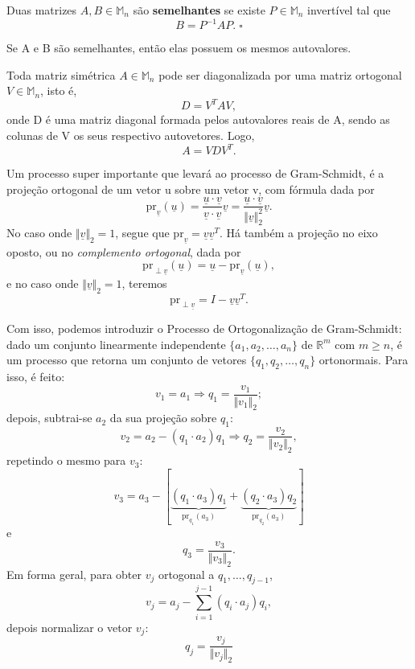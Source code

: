 \documentclass[../numerical_methods.tex]{subfiles}
\begin{document}
\begin{def*}
	Duas matrizes \(A, B\in \mathbb{M}_{n}\) são \textbf{semelhantes} se existe \(P\in \mathbb{M}_{n}\) invertível tal que
	\[
		B = P^{-1}A P. \; \square
	\]
\end{def*}
\begin{prop*}
	Se A e B são semelhantes, então elas possuem os mesmos autovalores.
\end{prop*}

Toda matriz simétrica \(A\in \mathbb{M}_{n}\) pode ser diagonalizada por uma matriz ortogonal \(V\in \mathbb{M}_{n}\), isto é,
\[
	D = V^{T}AV,
\]
onde D é uma matriz diagonal formada pelos autovalores reais de A, sendo as colunas de V os seus respectivo autovetores. Logo,
\[
	A = VDV^{T}.
\]

Um processo super importante que levará ao processo de Gram-Schmidt, é a projeção ortogonal de um vetor u sobre um vetor v, com fórmula dada por
\[
	\mathrm{pr}_{\underline{v}}(\underline{u}) = \frac{\underline{u}\cdot \underline{v}}{\underline{v}\cdot \underline{v}}\underline{v} = \frac{\underline{u}\cdot \underline{v}}{\Vert \underline{v} \Vert_{2}^{2}}\underline{v}.
\]
No caso onde \(\Vert \underline{v} \Vert_{2} = 1\), segue que \(\mathrm{pr}_{\underline{v}}= \underline{v}\underline{v}^{T}\). Há também a projeção no eixo oposto, ou no \textit{complemento ortogonal}, dada por
\[
	\mathrm{pr}_{\perp \underline{v}}(\underline{u}) = \underline{u} - \mathrm{pr}_{\underline{v}}(\underline{u}),
\]
e no caso onde \(\Vert \underline{v} \Vert_{2} = 1\), teremos
\[
	\mathrm{pr}_{\perp \underline{v}}=I - \underline{v}\underline{v}^{T}.
\]

Com isso, podemos introduzir o \hypertarget{gram_schmidt}{Processo de Ortogonalização de Gram-Schmidt}: dado um conjunto linearmente independente \(\{a_1, a_2, \dotsc , a_{n}\}\) de \(\mathbb{R}^{m}\) com \(m\geq n\), é um processo que retorna um conjunto de vetores \(\{q_1, q_2, \dotsc , q_{n}\}\) ortonormais. Para isso, é feito:
\[
	v_1 = a_1 \Rightarrow q_1 = \frac{v_1}{\Vert v_1 \Vert_{2}};
\]
depois, subtrai-se \(a_2\) da sua projeção sobre \(q_1\):
\[
	v_2 = a_2 - (q_1 \cdot a_2)q_1 \Rightarrow q_2 = \frac{v_2}{\Vert v_2 \Vert_2},
\]
repetindo o mesmo para \(v_3\):
\[
	v_3 = a_3 - [\underbrace{(q_1 \cdot a_3)q_1}_{\mathrm{pr}_{q_1}(a_3)} + \underbrace{(q_2 \cdot a_3) q_2}_{\mathrm{pr}_{q_2}(a_3)}]
\]
e
\[
	q_3 = \frac{v_3}{\Vert v_3 \Vert_2}.
\]
Em forma geral, para obter \(v_{j}\) ortogonal a \(q_1, \dotsc , q_{j-1}\),
\[
	\boxed{v_{j} = a_{j}-\sum\limits_{i=1}^{j-1}(q_{i} \cdot  a_{j})q_{i}},
\]
depois normalizar o vetor \(v_{j}\):
\[
	\boxed{q_{j} = \frac{v_{j}}{\Vert v_{j} \Vert_2}}
\]
\end{document}
